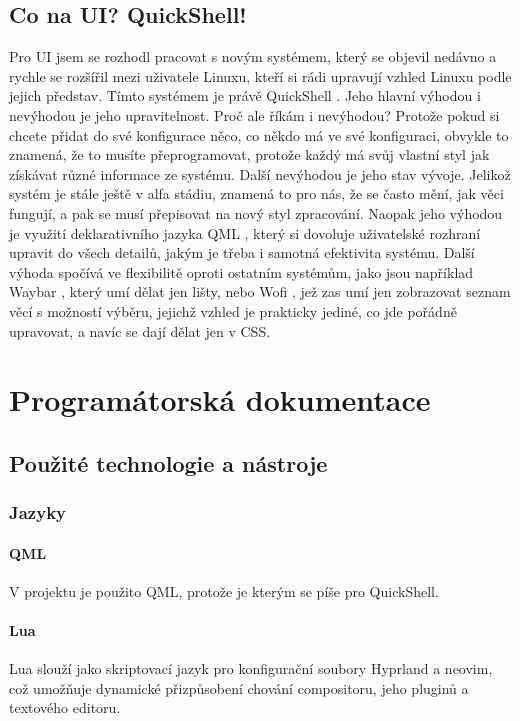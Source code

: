 \documentclass[12pt,a4paper]{article}
\begin{document}
\subsection{Co na UI? QuickShell!}
Pro UI jsem se rozhodl pracovat s novým systémem, který se objevil nedávno a rychle se rozšířil mezi uživatele Linuxu,
kteří si rádi upravují vzhled Linuxu podle jejich představ. Tímto systémem je právě QuickShell \autocite{Quickshell}.
Jeho hlavní výhodou i nevýhodou je jeho upravitelnost. Proč ale říkám i nevýhodou? Protože pokud si chcete přidat do
své konfigurace něco, co někdo má ve své konfiguraci, obvykle to znamená, že to musíte přeprogramovat, protože každý
má svůj vlastní styl jak získávat různé informace ze systému. Další nevýhodou je jeho stav vývoje. Jelikož systém je
stále ještě v alfa stádiu, znamená to pro nás, že se často mění, jak věci fungují, a pak se musí přepisovat na nový
styl zpracování. Naopak jeho výhodou je využití deklarativního jazyka QML \autocite{QtDocumentation}, který
si dovoluje uživatelské rozhraní upravit do všech detailů, jakým je třeba i samotná efektivita systému. Další výhoda
spočívá ve flexibilitě oproti ostatním systémům, jako jsou například Waybar \autocite{rouillardAlexaysWaybar2026}, 
který umí dělat jen lišty, nebo Wofi \autocite{ScooptaWofiThis},
jež zas umí jen zobrazovat seznam věcí s možností výběru, jejichž vzhled je prakticky jediné, co jde pořádně upravovat,
a navíc se dají dělat jen v CSS.

\newpage
\section{Programátorská dokumentace}

\subsection{Použité technologie a nástroje}

\subsubsection{Jazyky}
\paragraph{QML}
V projektu je použito QML, protože je kterým se píše pro QuickShell. \autocite{QtDocumentation}

\paragraph{Lua}
Lua slouží jako skriptovací jazyk pro konfigurační soubory Hyprland a neovim, což umožňuje dynamické přizpůsobení 
chování compositoru, jeho pluginů a textového editoru.
\end{document}
